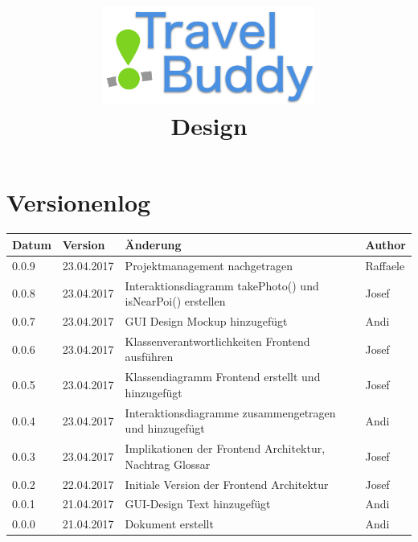 \documentclass[a4paper,10pt,xetex]{article}
\title{
  \includegraphics[width=7cm]{travel-buddy_white}\\[\bigskipamount]
  Design\\[\bigskipamount]
}
\author{\documentauthors}
\date{\parbox{\linewidth}{\centering%
  IT15TA ZH \hspace*{3cm} Gruppe 3\endgraf\bigskip
  \documentdate\endgraf
}}
\begin{document}
\maketitle\newpage

{
\hypersetup{linkcolor=black}
\setcounter{tocdepth}{3}
\tableofcontents
}

\newpage

\section{Versionenlog}\label{versionenlog}

\tabulinesep=1.2mm

\begin{longtabu} to \textwidth { | l | l | X[l] | l | }
  \hline
  \textbf{Datum} & \textbf{Version} & \textbf{Änderung} & \textbf{Author} \\
  \hline
  \endhead

  0.0.9 & 23.04.2017 & Projektmanagement nachgetragen & Raffaele \\
  \hline

  0.0.8 & 23.04.2017 & Interaktionsdiagramm takePhoto() und isNearPoi() erstellen & Josef \\
  \hline

  0.0.7 & 23.04.2017 & GUI Design Mockup hinzugefügt & Andi \\
  \hline

  0.0.6 & 23.04.2017 & Klassenverantwortlichkeiten Frontend ausführen & Josef \\
  \hline

  0.0.5 & 23.04.2017 & Klassendiagramm Frontend erstellt und hinzugefügt & Josef \\
  \hline

  0.0.4 & 23.04.2017 & Interaktionsdiagramme zusammengetragen und hinzugefügt & Andi \\
  \hline

  0.0.3 & 23.04.2017 & Implikationen der Frontend Architektur, Nachtrag Glossar & Josef \\
  \hline

  0.0.2 & 22.04.2017 & Initiale Version der Frontend Architektur & Josef \\
  \hline

  0.0.1 & 21.04.2017 & GUI-Design Text hinzugefügt & Andi\\
  \hline

  0.0.0 & 21.04.2017 & Dokument erstellt & Andi\\
  \hline
\end{longtabu}
\newpage
\end{document}

